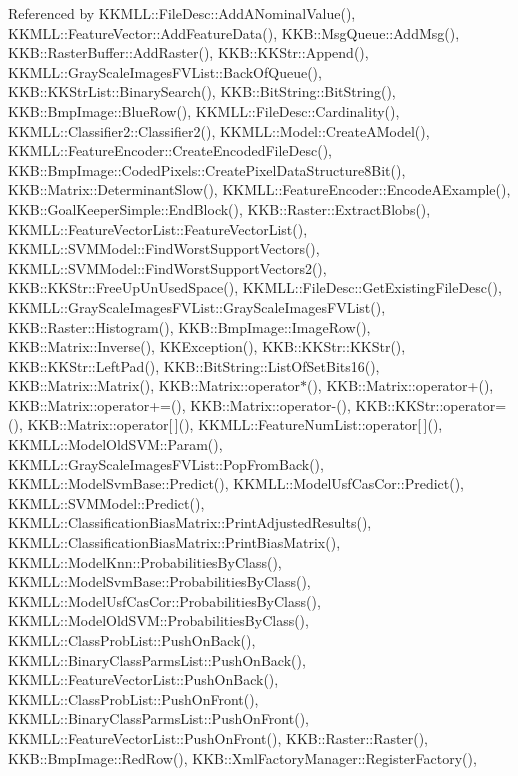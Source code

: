 Referenced by K\+K\+M\+L\+L\+::\+File\+Desc\+::\+Add\+A\+Nominal\+Value(), K\+K\+M\+L\+L\+::\+Feature\+Vector\+::\+Add\+Feature\+Data(), K\+K\+B\+::\+Msg\+Queue\+::\+Add\+Msg(), K\+K\+B\+::\+Raster\+Buffer\+::\+Add\+Raster(), K\+K\+B\+::\+K\+K\+Str\+::\+Append(), K\+K\+M\+L\+L\+::\+Gray\+Scale\+Images\+F\+V\+List\+::\+Back\+Of\+Queue(), K\+K\+B\+::\+K\+K\+Str\+List\+::\+Binary\+Search(), K\+K\+B\+::\+Bit\+String\+::\+Bit\+String(), K\+K\+B\+::\+Bmp\+Image\+::\+Blue\+Row(), K\+K\+M\+L\+L\+::\+File\+Desc\+::\+Cardinality(), K\+K\+M\+L\+L\+::\+Classifier2\+::\+Classifier2(), K\+K\+M\+L\+L\+::\+Model\+::\+Create\+A\+Model(), K\+K\+M\+L\+L\+::\+Feature\+Encoder\+::\+Create\+Encoded\+File\+Desc(), K\+K\+B\+::\+Bmp\+Image\+::\+Coded\+Pixels\+::\+Create\+Pixel\+Data\+Structure8\+Bit(), K\+K\+B\+::\+Matrix\+::\+Determinant\+Slow(), K\+K\+M\+L\+L\+::\+Feature\+Encoder\+::\+Encode\+A\+Example(), K\+K\+B\+::\+Goal\+Keeper\+Simple\+::\+End\+Block(), K\+K\+B\+::\+Raster\+::\+Extract\+Blobs(), K\+K\+M\+L\+L\+::\+Feature\+Vector\+List\+::\+Feature\+Vector\+List(), K\+K\+M\+L\+L\+::\+S\+V\+M\+Model\+::\+Find\+Worst\+Support\+Vectors(), K\+K\+M\+L\+L\+::\+S\+V\+M\+Model\+::\+Find\+Worst\+Support\+Vectors2(), K\+K\+B\+::\+K\+K\+Str\+::\+Free\+Up\+Un\+Used\+Space(), K\+K\+M\+L\+L\+::\+File\+Desc\+::\+Get\+Existing\+File\+Desc(), K\+K\+M\+L\+L\+::\+Gray\+Scale\+Images\+F\+V\+List\+::\+Gray\+Scale\+Images\+F\+V\+List(), K\+K\+B\+::\+Raster\+::\+Histogram(), K\+K\+B\+::\+Bmp\+Image\+::\+Image\+Row(), K\+K\+B\+::\+Matrix\+::\+Inverse(), K\+K\+Exception(), K\+K\+B\+::\+K\+K\+Str\+::\+K\+K\+Str(), K\+K\+B\+::\+K\+K\+Str\+::\+Left\+Pad(), K\+K\+B\+::\+Bit\+String\+::\+List\+Of\+Set\+Bits16(), K\+K\+B\+::\+Matrix\+::\+Matrix(), K\+K\+B\+::\+Matrix\+::operator$\ast$(), K\+K\+B\+::\+Matrix\+::operator+(), K\+K\+B\+::\+Matrix\+::operator+=(), K\+K\+B\+::\+Matrix\+::operator-\/(), K\+K\+B\+::\+K\+K\+Str\+::operator=(), K\+K\+B\+::\+Matrix\+::operator\mbox{[}$\,$\mbox{]}(), K\+K\+M\+L\+L\+::\+Feature\+Num\+List\+::operator\mbox{[}$\,$\mbox{]}(), K\+K\+M\+L\+L\+::\+Model\+Old\+S\+V\+M\+::\+Param(), K\+K\+M\+L\+L\+::\+Gray\+Scale\+Images\+F\+V\+List\+::\+Pop\+From\+Back(), K\+K\+M\+L\+L\+::\+Model\+Svm\+Base\+::\+Predict(), K\+K\+M\+L\+L\+::\+Model\+Usf\+Cas\+Cor\+::\+Predict(), K\+K\+M\+L\+L\+::\+S\+V\+M\+Model\+::\+Predict(), K\+K\+M\+L\+L\+::\+Classification\+Bias\+Matrix\+::\+Print\+Adjusted\+Results(), K\+K\+M\+L\+L\+::\+Classification\+Bias\+Matrix\+::\+Print\+Bias\+Matrix(), K\+K\+M\+L\+L\+::\+Model\+Knn\+::\+Probabilities\+By\+Class(), K\+K\+M\+L\+L\+::\+Model\+Svm\+Base\+::\+Probabilities\+By\+Class(), K\+K\+M\+L\+L\+::\+Model\+Usf\+Cas\+Cor\+::\+Probabilities\+By\+Class(), K\+K\+M\+L\+L\+::\+Model\+Old\+S\+V\+M\+::\+Probabilities\+By\+Class(), K\+K\+M\+L\+L\+::\+Class\+Prob\+List\+::\+Push\+On\+Back(), K\+K\+M\+L\+L\+::\+Binary\+Class\+Parms\+List\+::\+Push\+On\+Back(), K\+K\+M\+L\+L\+::\+Feature\+Vector\+List\+::\+Push\+On\+Back(), K\+K\+M\+L\+L\+::\+Class\+Prob\+List\+::\+Push\+On\+Front(), K\+K\+M\+L\+L\+::\+Binary\+Class\+Parms\+List\+::\+Push\+On\+Front(), K\+K\+M\+L\+L\+::\+Feature\+Vector\+List\+::\+Push\+On\+Front(), K\+K\+B\+::\+Raster\+::\+Raster(), K\+K\+B\+::\+Bmp\+Image\+::\+Red\+Row(), K\+K\+B\+::\+Xml\+Factory\+Manager\+::\+Register\+Factory(), 